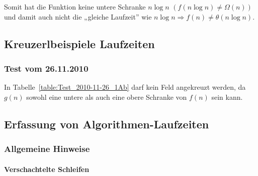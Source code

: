 \documentclass[a4paper, 12pt]{article}
\begin{document}
Somit hat die Funktion keine untere Schranke $n \log n$	 $\left(f(n \log n)≠ Ω(n)\right)$ und damit auch nicht die „gleiche Laufzeit” wie $n \log n \Rightarrow f(n) ≠ θ(n \log n)$.

\subsection{Kreuzerlbeispiele Laufzeiten}

\subsubsection{Test vom 26.11.2010}

\begin{table}[htbp]

\caption{Beispiel 1b) der Gruppe A}
\label{table:Test_2010-11-26_1Ab}
	\begin{center}
\end{center}
\end{table}

In Tabelle~\ref{table:Test_2010-11-26_1Ab} darf kein Feld angekreuzt werden, da $g\left(n\right)$ sowohl eine untere als auch eine obere Schranke von  $f\left(n\right)$ sein kann.

\subsection{Erfassung von Algorithmen-Laufzeiten}

\subsubsection{Allgemeine Hinweise}

\paragraph{Verschachtelte Schleifen}~\\
\end{document}
